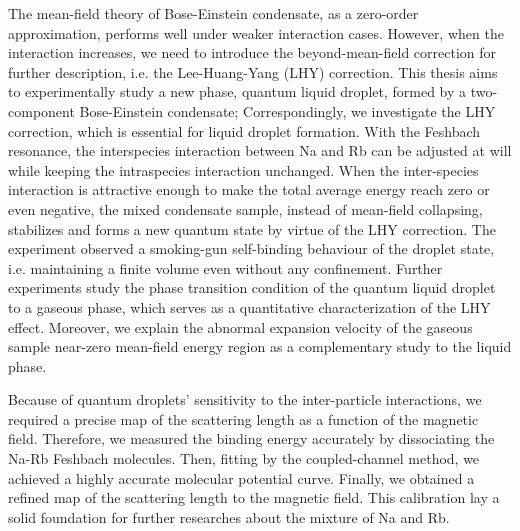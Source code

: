 The mean-field theory of Bose-Einstein condensate, as a zero-order approximation, performs well under weaker interaction cases. However, when the interaction increases, we need to introduce the beyond-mean-field correction for further description, i.e. the Lee-Huang-Yang (LHY) correction. This thesis aims to experimentally study a new phase, quantum liquid droplet, formed by a two-component Bose-Einstein condensate; Correspondingly, we investigate the LHY correction, which is essential for liquid droplet formation. With the Feshbach resonance, the interspecies interaction between Na and Rb can be adjusted at will while keeping the intraspecies interaction unchanged. When the inter-species interaction is attractive enough to make the total average energy reach zero or even negative, the mixed condensate sample, instead of mean-field collapsing, stabilizes and forms a new quantum state by virtue of the LHY correction. The experiment observed a smoking-gun self-binding behaviour of the droplet state, i.e. maintaining a finite volume even without any confinement. Further experiments study the phase transition condition of the quantum liquid droplet to a gaseous phase, which serves as a quantitative characterization of the LHY effect. Moreover, we explain the abnormal expansion velocity of the gaseous sample near-zero mean-field energy region as a complementary study to the liquid phase.

Because of quantum droplets' sensitivity to the inter-particle interactions, we required a precise map of the scattering length as a function of the magnetic field. Therefore, we measured the binding energy accurately by dissociating the Na-Rb Feshbach molecules. Then, fitting by the coupled-channel method, we achieved a highly accurate molecular potential curve. Finally, we obtained a refined map of the scattering length to the magnetic field. This calibration lay a solid foundation for further researches about the mixture of Na and Rb.